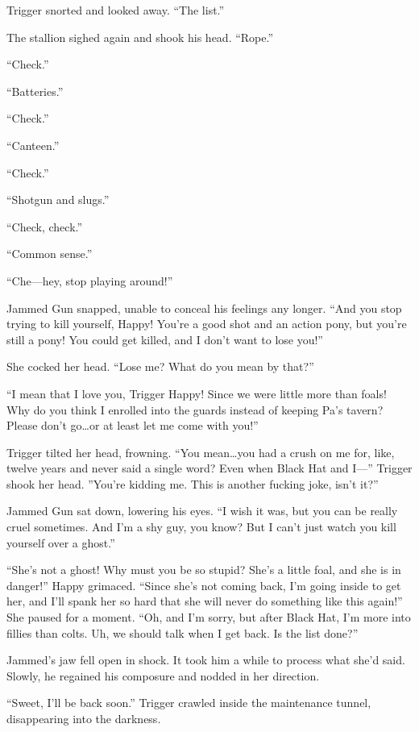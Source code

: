 Trigger snorted and looked away. ``The list.''

The stallion sighed again and shook his head. ``Rope.''

``Check.''

``Batteries.''

``Check.''

``Canteen.''

``Check.''

``Shotgun and slugs.''

``Check, check.''

``Common sense.''

``Che---hey, stop playing around!''

Jammed Gun snapped, unable to conceal his feelings any longer. ``And you stop trying to kill yourself, Happy! You're a good shot and an action pony, but you're still a pony! You could get killed, and I don't want to lose you!''

She cocked her head. ``Lose me? What do you mean by that?''

``I mean that I love you, Trigger Happy! Since we were little more than foals! Why do you think I enrolled into the guards instead of keeping Pa's tavern? Please don't go\dots or at least let me come with you!''

Trigger tilted her head, frowning. ``You mean\dots you had a crush on me for, like, twelve years and never said a single word? Even when Black Hat and I---'' Trigger shook her head. ''You're kidding me. This is another fucking joke, isn't it?''

Jammed Gun sat down, lowering his eyes. ``I wish it was, but you can be really cruel sometimes. And I'm a shy guy, you know? But I can't just watch you kill yourself over a ghost.''

``She's not a ghost! Why must you be so stupid? She's a little foal, and she is in danger!'' Happy grimaced. ``Since she's not coming back, I'm going inside to get her, and I'll spank her so hard that she will never do something like this again!'' She paused for a moment. ``Oh, and I'm sorry, but after Black Hat, I'm more into fillies than colts. Uh, we should talk when I get back. Is the list done?''

Jammed's jaw fell open in shock. It took him a while to process what she'd said. Slowly, he regained his composure and nodded in her direction.

``Sweet, I'll be back soon.'' Trigger crawled inside the maintenance tunnel, disappearing into the darkness.

